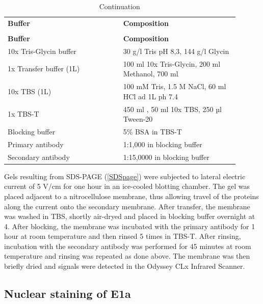 \begin{longtable}{L{0.45\linewidth} R{0.45\linewidth}}
\caption{Western Blot Buffer composition}
\label{WBbuffercomp}
\\
\toprule
{}
\textbf{Buffer}& \textbf{Composition}\\                           
\midrule
\endfirsthead
{}
\caption[]{Continuation}
\\
\midrule
{}
\textbf{Buffer}& \textbf{Composition}\\ 
\midrule
\endhead
\bottomrule
\endfoot
10x Tris-Glycin buffer & 30 g/l Tris pH 8,3, 144 g/l Glycin \\
1x Transfer buffer (1L) & 100 ml 10x Tris-Glycin, 200 ml Methanol, 700 ml  \\
10x TBS	(1L) & 100 mM Tris, 1.5 M NaCl, 60 ml HCl ad 1L  ph 7.4 \\
1x TBS-T & 450 ml , 50 ml 10x TBS, 250 µl Tween-20 \\
Blocking buffer & 5\% BSA in TBS-T\\
Primary antibody & 1:1,000 in blocking buffer\\
Secondary antibody & 1:15,0000 in blocking buffer\\
\end{longtable}

Gels resulting from SDS-PAGE (\ref{SDSpage}) were subjected to lateral electric current of  5 V/cm for one hour in an ice-cooled blotting chamber. The gel was placed adjacent to a nitrocellulose membrane, thus allowing travel of the proteins along the current onto the secondary membrane. After transfer, the membrane was washed in TBS, shortly air-dryed and placed in blocking buffer overnight at 4\C. After blocking, the membrane was incubated with the primary antibody for 1 hour at room temperature and then rinsed 5 times in TBS-T. After rinsing, incubation with the secondary antibody was performed for 45 minutes at room temperature and rinsing was repeated as done above. The membrane was then briefly dried and signals were detected in the Odyssey CLx Infrared Scanner.


\subsection{Nuclear staining of E1a}
\label{E1 nuclear stain}

